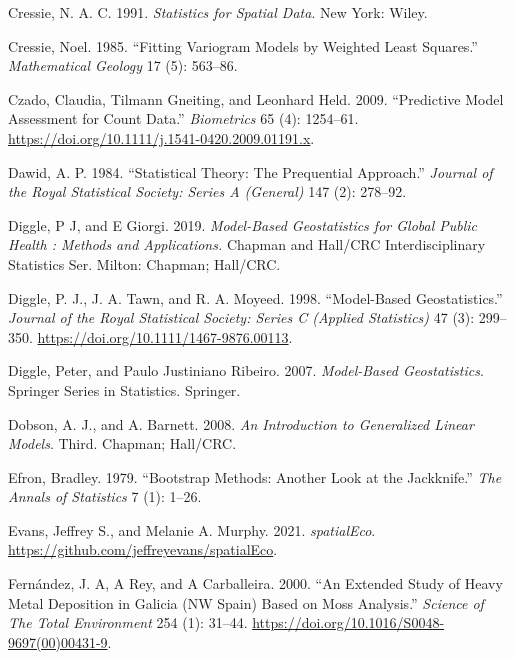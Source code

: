 \documentclass[
  letterpaper,
]{krantz}
\newlength{\cslhangindent}
\newenvironment{CSLReferences}[2] %
 {\begin{list}{}{%
  \setlength{\itemindent}{0pt}
  \setlength{\leftmargin}{0pt}
  \setlength{\parsep}{0pt}
  \ifodd #1
   \setlength{\leftmargin}{\cslhangindent}
   \setlength{\itemindent}{-1\cslhangindent}
  \fi
  \setlength{\itemsep}{#2\baselineskip}}}
 {\end{list}}
\begin{document}
\begin{CSLReferences}{1}{0}
Cressie, N. A. C. 1991. \emph{Statistics for Spatial Data}. New York:
Wiley.

Cressie, Noel. 1985. {``Fitting Variogram Models by Weighted Least
Squares.''} \emph{Mathematical Geology} 17 (5): 563--86.

Czado, Claudia, Tilmann Gneiting, and Leonhard Held. 2009.
{``{Predictive Model Assessment for Count Data}.''} \emph{Biometrics} 65
(4): 1254--61. \url{https://doi.org/10.1111/j.1541-0420.2009.01191.x}.

Dawid, A. P. 1984. {``Statistical Theory: The Prequential Approach.''}
\emph{Journal of the Royal Statistical Society: Series A (General)} 147
(2): 278--92.

Diggle, P J, and E Giorgi. 2019. \emph{Model-Based Geostatistics for
Global Public Health : Methods and Applications.} Chapman and Hall/CRC
Interdisciplinary Statistics Ser. Milton: Chapman; Hall/CRC.

Diggle, P. J., J. A. Tawn, and R. A. Moyeed. 1998. {``Model-Based
Geostatistics.''} \emph{Journal of the Royal Statistical Society: Series
C (Applied Statistics)} 47 (3): 299--350.
\url{https://doi.org/10.1111/1467-9876.00113}.

Diggle, Peter, and Paulo Justiniano Ribeiro. 2007. \emph{Model-Based
Geostatistics}. Springer Series in Statistics. Springer.

Dobson, A. J., and A. Barnett. 2008. \emph{An Introduction to
Generalized Linear Models}. Third. Chapman; Hall/CRC.

Efron, Bradley. 1979. {``Bootstrap Methods: Another Look at the
Jackknife.''} \emph{The Annals of Statistics} 7 (1): 1--26.

Evans, Jeffrey S., and Melanie A. Murphy. 2021. \emph{spatialEco}.
\url{https://github.com/jeffreyevans/spatialEco}.

Fernández, J. A, A Rey, and A Carballeira. 2000. {``An Extended Study of
Heavy Metal Deposition in Galicia (NW Spain) Based on Moss Analysis.''}
\emph{Science of The Total Environment} 254 (1): 31--44.
\url{https://doi.org/10.1016/S0048-9697(00)00431-9}.


\end{CSLReferences}
\end{document}
